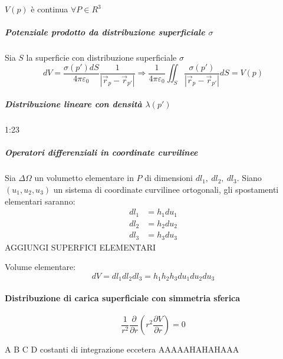 $V(p)$ è continua $\forall P \in R^3$

\subparagraph{Potenziale prodotto da distribuzione superficiale $\sigma$}
Sia $S$ la superficie con distribuzione superficiale $\sigma$
$$
dV = \frac{\sigma(p')dS}{4\pi\varepsilon_0} \frac{1}{|\vec{r}_p - \vec{r}_{p'}|} \Rightarrow
\frac{1}{4\pi\varepsilon_0} \iint_S \frac{\sigma(p')}{|\vec{r}_p - \vec{r}_{p'}|} dS = V(p)
$$

\subparagraph{Distribuzione lineare con densità $\lambda(p')$}
1:23

\subparagraph{Operatori differenziali in coordinate curvilinee}
Sia $\Delta\Omega$ un volumetto elementare in $P$ di dimensioni $dl_1,\ dl_2,\ dl_3$.
Siano $(u_1,u_2,u_3)$ un sistema di coordinate curvilinee ortogonali, gli spostamenti elementari
saranno:
\begin{align*}
dl_1 &= h_1du_1\\
dl_2 &= h_2du_2\\
dl_3 &= h_3du_3
\end{align*}
AGGIUNGI SUPERFICI ELEMENTARI

Volume elementare:
$$
dV = dl_1dl_2dl_3 = h_1h_2h_3du_1du_2du_3
$$






\paragraph{Distribuzione di carica superficiale con simmetria sferica}
$$
\frac{1}{r^2}\frac{\partial}{\partial r} \left(r^2 \frac{\partial V}{\partial r}\right) = 0
$$

A B C D costanti di integrazione eccetera AAAAAHAHAHAAA

